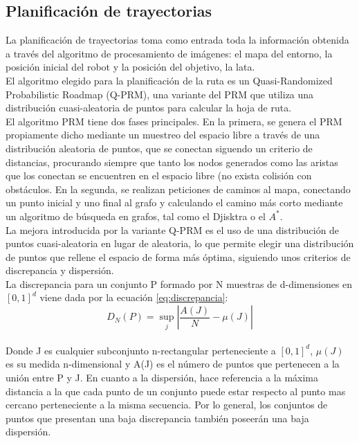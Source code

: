 \subsection{Planificación de trayectorias}
\label{planificacion}

La planificación de trayectorias toma como entrada toda la información obtenida a través del algoritmo de procesamiento de imágenes: el mapa del entorno, la posición inicial del robot y la posición del objetivo, la lata.\\

El algoritmo elegido para la planificación de la ruta es un Quasi-Randomized Probabilistic Roadmap (Q-PRM), una variante del PRM que utiliza una distribución cuasi-aleatoria de puntos para calcular la hoja de ruta.\\

El algoritmo PRM tiene dos fases principales. En la primera, se genera el PRM propiamente dicho mediante un muestreo del espacio libre a través de una distribución aleatoria de puntos, que se conectan siguendo un criterio de distancias, procurando siempre que tanto los nodos generados como las aristas que los conectan se encuentren en el espacio libre (no exista colisión con obstáculos. En la segunda, se realizan peticiones de caminos al mapa, conectando un punto inicial y uno final al grafo y calculando el camino más corto mediante un algoritmo de búsqueda en grafos, tal como el Djisktra o el $A^*$.\\

La mejora introducida por la variante Q-PRM es el uso de una distribución de puntos cuasi-aleatoria en lugar de aleatoria, lo que permite elegir una distribución de puntos que rellene el espacio de forma más óptima, siguiendo unos criterios de discrepancia y dispersión. \\

La discrepancia para un conjunto P formado por N muestras de d-dimensiones en $[0,1]^{d}$  viene dada por la ecuación \ref{eq:discrepancia}:
\begin{equation}
\label{eq:discrepancia}
D_N(P) = \sup_{j}{\left| \frac{A(J)}{N} -  \mu(J) \right| }
\end{equation}~\\

Donde J es cualquier subconjunto n-rectangular perteneciente a $[0,1]^{d}$, $\mu(J)$ es su medida n-dimensional y A(J) es el número de puntos que pertenecen a la unión entre P y J. En cuanto a la dispersión, hace referencia a la máxima distancia a la que cada punto de un conjunto puede estar respecto al punto mas cercano perteneciente a la misma secuencia. Por lo general, los conjuntos de puntos que presentan una baja discrepancia también poseerán una baja dispersión.\\

